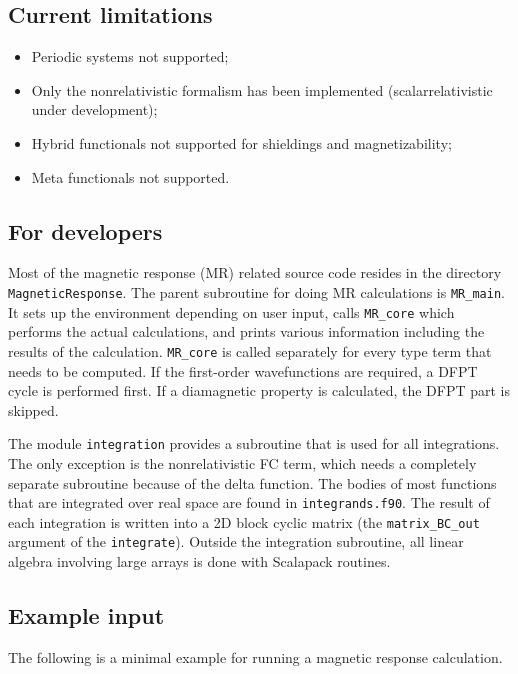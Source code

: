 \subsection*{Current limitations}

\begin{itemize}
\item Periodic systems not supported;
\item Only the nonrelativistic formalism has been implemented (scalarrelativistic under development);
\item Hybrid functionals not supported for shieldings and magnetizability;
\item Meta functionals not supported.
\end{itemize}

\subsection*{For developers}

Most of the magnetic response (MR) related source code resides in the directory \\ \verb+MagneticResponse+. The parent subroutine for doing MR calculations is \verb+MR_main+. It sets up the environment depending on user input, calls \verb+MR_core+ which performs the actual calculations, and prints various information including the results of the calculation. \verb+MR_core+ is called separately for every type term that needs to be computed. If the first-order wavefunctions are required, a DFPT cycle is performed first. If a diamagnetic property is calculated, the DFPT part is skipped.

The module \verb+integration+ provides a subroutine that is used for all integrations. The only exception is the nonrelativistic FC term, which needs a completely separate subroutine because of the delta function. The bodies of most functions that are integrated over real space are found in \texttt{integrands.f90}. The result of each integration is written into a 2D block cyclic matrix (the \verb+matrix_BC_out+ argument of the \texttt{integrate}). Outside the integration subroutine, all linear algebra involving large arrays is done with Scalapack routines.

\subsection*{Example input}

The following is a minimal example for running a magnetic response calculation.
